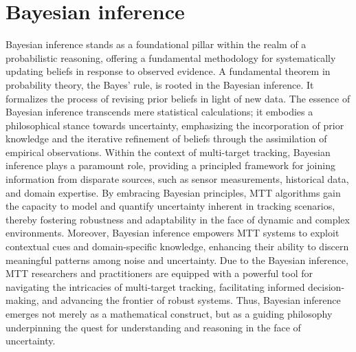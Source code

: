    \section{Bayesian inference}
Bayesian inference stands as a foundational pillar within the realm of a probabilistic reasoning, offering a
fundamental methodology for systematically updating beliefs in response to observed evidence. A fundamental theorem in probability theory, the Bayes' rule, is rooted in the Bayesian inference. It formalizes the process of revising prior beliefs in light of new data. The essence of Bayesian inference transcends mere statistical calculations; it embodies a philosophical stance towards uncertainty, emphasizing the incorporation of prior knowledge and the iterative refinement of beliefs through the assimilation of empirical observations. Within the context of multi-target tracking, Bayesian inference plays a paramount role, providing a principled framework for joining information from disparate sources, such as sensor measurements, historical data, and domain expertise. By embracing Bayesian principles, MTT algorithms gain the capacity to model and quantify uncertainty inherent in tracking scenarios, thereby fostering robustness and adaptability in the face of dynamic and complex environments. Moreover, Bayesian inference empowers MTT systems to exploit contextual cues and domain-specific knowledge, enhancing their ability to discern meaningful patterns among noise and uncertainty. Due to the Bayesian inference, MTT researchers and practitioners are equipped with a powerful tool for navigating the intricacies of multi-target tracking, facilitating informed decision-making, and advancing the frontier of robust systems. Thus, Bayesian inference emerges not merely as a mathematical construct, but as a guiding philosophy underpinning the quest for understanding and reasoning in the face of uncertainty.
